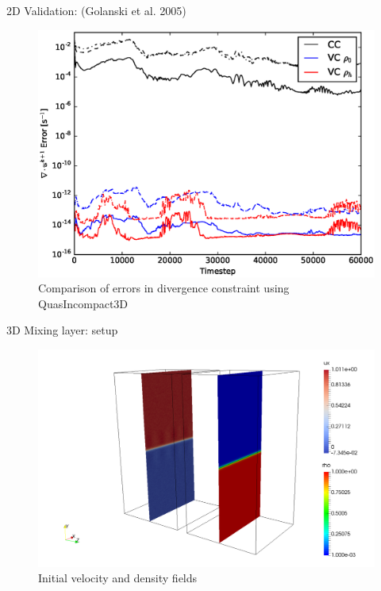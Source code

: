 \documentclass[presentation]{beamer}
\begin{document}
\begin{frame}[label=sec-3]{2D Validation: (Golanski et al. 2005)}
\begin{figure}[htb]
\centering
\includegraphics[width=0.75\linewidth]{./figures/err_divu.eps}
\caption{Comparison of errors in divergence constraint using QuasIncompact3D}
\end{figure}
\end{frame}

\begin{frame}[label=sec-4]{3D Mixing layer: setup}
\begin{figure}[htb]
\centering
\includegraphics[width=0.9\linewidth]{./figures/r1000-t0.png}
\caption{Initial velocity and density fields}
\end{figure}
\end{frame}
\end{document}
